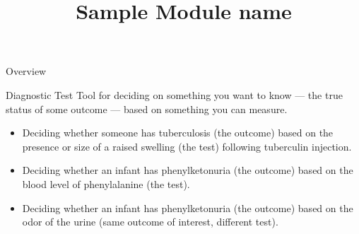 




\title{Sample Module name}

\newcommand{\LicenseText}{Made available under the Creative Commons Attribution-ShareAlike 3.0 Unported License: http://creativecommons.org/licenses/by-sa/3.0/deed.en\textunderscore US }






\begin{frame}[plain]
	\titlepage
\end{frame}






\begin{frame}{Overview}

	\begin{block}{Diagnostic Test}
		Tool for deciding on something you want to know --- the true status of some outcome --- based on something you can measure.

		\begin{itemize}

			\item{Deciding whether someone has tuberculosis (the outcome) based on the presence or size of a raised swelling (the test) following tuberculin injection.}

			\item{Deciding whether an infant has phenylketonuria (the outcome) based on the blood level of phenylalanine (the test).}

			\item{Deciding whether an infant has phenylketonuria (the outcome) based on the odor of the urine (same outcome of interest, different test).}
		\end{itemize}

	\end{block}

\end{frame}



